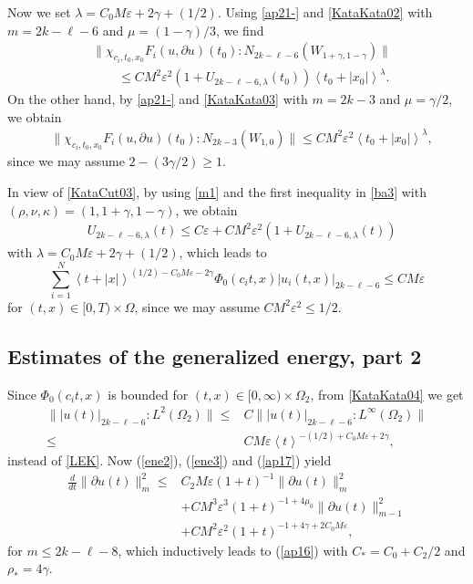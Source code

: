 \documentclass[12pt]{amsart}
\newcommand{\ve}{\varepsilon}
\newcommand{\pa}{\partial}
\newcommand{\jb}[1]{\left\langle #1 \right\rangle}
\newcommand{\norm}[2]{\|#1 \!:\! #2\|}
\numberwithin{equation}{section}
\begin{document}
Now we set $\lambda=C_0M\ve+2\gamma+(1/2)$.
Using \eqref{ap21-} and \eqref{KataKata02}
with $m=2k-\ell-6$ and $\mu=(1-\gamma)/3$,
we find
\begin{align*}
  &\|\chi_{c_i, t_0, x_0}F_i(u,\partial u)(t_0)\!:\! N_{2k-\ell-6}(W_{1+\gamma, 
1-\gamma})\|\\
   & \qquad \le 
 CM^2\ve^2(1+U_{2k-\ell-6, \lambda}(t_0))
\jb{t_0+|x_0|}^{\lambda}. %
\end{align*}
On the other hand, by \eqref{ap21-} and \eqref{KataKata03} with $m=2k-3$
and $\mu=\gamma/2$, we obtain
  \begin{align*}
   &\|\chi_{c_i, t_0, x_0}F_i(u,\partial u)(t_0)\!:\! N_{2k-3}(W_{1, 0})\|
 \le CM^2\ve^2 \jb{t_0+|x_0|}^{\lambda},
  \end{align*}
since we may assume $2-(3\gamma/2)\ge 1$.

In view of \eqref{KataCut03}, by using \eqref{m1} and the first inequality in \eqref{ba3} with $(\rho, \nu, \kappa)=(1, 1+\gamma, 1-\gamma)$, we obtain
\begin{align*}
& U_{2k-\ell-6, \lambda}(t)\le C\ve+CM^2\ve^2
(1+U_{2k-\ell-6, \lambda}(t))
\end{align*}
with $\lambda=C_0M\ve+2\gamma+(1/2)$,
which leads to
\begin{equation}
 \sum_{i=1}^N \jb{t+|x|}^{(1/2)-C_0M\ve-2\gamma}\Phi_0(c_it, x)
 |u_i(t,x)|_{2k-\ell-6}\le CM\ve 
\label{KataKata04}
\end{equation}
for $(t,x)\in [0, T)\times \Omega$, since we may assume $CM^2\ve^2\le 1/2$.
\subsection{Estimates of the generalized energy, part 2}\label{KEE3}
Since $\Phi_0(c_it,x)$ is bounded for $(t, x)\in [0,\infty)\times \Omega_2$,
from \eqref{KataKata04} we get
\begin{align}
\label{ap17}
\norm{|u(t)|_{2k-\ell-6}}{L^2(\Omega_2)}
\le & C\norm{|u(t)|_{2k-\ell-6}}{L^\infty(\Omega_2)}\\
\le & CM\ve \jb{t}^{-(1/2)+C_0M\ve+2\gamma}, \nonumber
\end{align}
instead of \eqref{LEK}.
Now (\ref{ene2}), (\ref{ene3}) and (\ref{ap17}) yield
\begin{align}\nonumber
\frac{d}{dt}\|\pa u(t)\|_{m}^2 \le &
C_2 M\ve (1+t)^{-1} \|\pa u(t)\|_{m}^2 
\\ \nonumber
&+CM^3\ve^3(1+t)^{-1+4\mu_0} \|\pa u(t)\|_{m-1}^2
\nonumber\\
&+CM^2\ve^2 (1+t)^{-1+4\gamma+2C_0 M\ve},
\nonumber
\end{align}
for $m\le 2k-\ell-8$,
which inductively leads to (\ref{ap16}) with $C_*=C_0+C_2/2$ and $\rho_*=4\gamma$.
\end{document}
